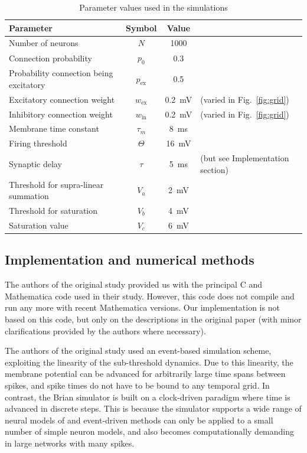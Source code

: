 \documentclass[10pt,a4paper,onecolumn]{article}
\begin{document}
\begin{table}[ht]
\begin{tabular}{ l  c  S p{2.85cm}}
  \toprule
  {Parameter} & {Symbol} & {Value} &\\
  \midrule
  Number of neurons & $N$ & 1000 &\\
  Connection probability & $p_0$ & 0.3 &\\
  Probability connection being excitatory & $p_\text{ex}$ & 0.5 &\\
  Excitatory connection weight & $w_\text{ex}$ & \SI{0.2}{\milli\volt} & (varied in Fig.~\ref{fig:grid})\\
  Inhibitory connection weight & $w_\text{in}$ & \SI{0.2}{\milli\volt} & (varied in Fig.~\ref{fig:grid})\\
  Membrane time constant & $ \tau_m $ & \SI{8}{\milli\second} &\\
  Firing threshold & $\Theta$ & \SI{16}{\milli\volt} &\\
  Synaptic delay & $\tau$ & \SI{5}{\milli\second} & (but see Implementation section)\\
  Threshold for supra-linear summation & $V_a$ & \SI{2}{\milli\volt} \\
  Threshold for saturation & $V_b$ & \SI{4}{\milli\volt} \\
  Saturation value & $V_c$ & \SI{6}{\milli\volt} \\
  \bottomrule
\end{tabular}
\caption{Parameter values used in the simulations}\label{tab:parameters}
\end{table}

\subsection*{Implementation and numerical methods}
The authors of the original study provided us with the principal C and Mathematica code used in their study. However, this code does not compile and run any more with recent Mathematica versions. Our implementation is not based on this code, but only on the descriptions in the original paper (with minor clarifications provided by the authors where necessary).

The authors of the original study used an event-based simulation scheme, exploiting the linearity of the sub-threshold dynamics. Due to this linearity, the membrane potential can be advanced for arbitrarily large time spans between spikes, and spike times do not have to be bound to any temporal grid. In contrast, the Brian simulator is built on a clock-driven paradigm where time is advanced in discrete steps. This is because the simulator supports a wide range of neural models of and event-driven methods can only be applied to a small number of simple neuron models, and also becomes computationally demanding in large networks with many spikes.
\end{document}
